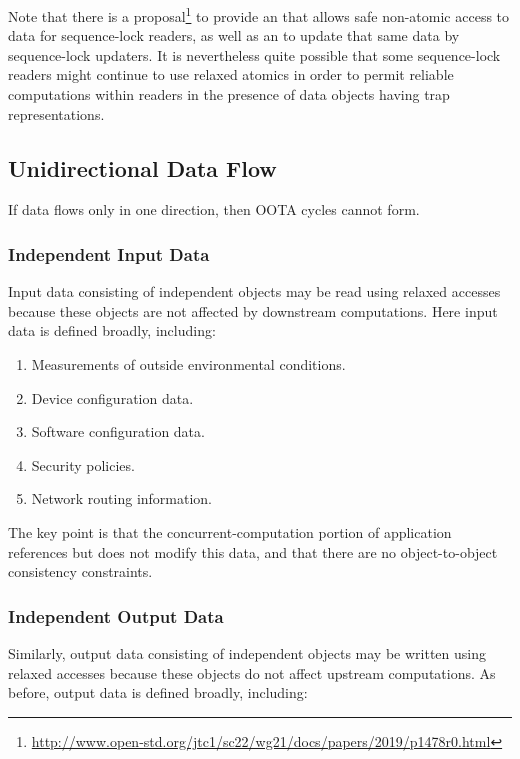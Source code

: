 \documentclass[10]{article}
\begin{document}
Note that there is a proposal\footnote{
	\url{http://www.open-std.org/jtc1/sc22/wg21/docs/papers/2019/p1478r0.html}}
to provide an  that allows safe
non-atomic access to data for sequence-lock readers, as well as an
 to update that same data by
sequence-lock updaters.
It is nevertheless quite possible that some sequence-lock readers
might continue to use relaxed atomics in order to permit reliable
computations within readers in the presence of data objects having
trap representations.

\subsection{Unidirectional Data Flow}
\label{sec:Unidirectional Data Flow}

If data flows only in one direction, then OOTA cycles cannot form.

\subsubsection{Independent Input Data}
\label{sec:Independent Input Data}

Input data consisting of independent objects may be read using relaxed
accesses because these objects are not affected by downstream computations.
Here input data is defined broadly, including:

\begin{enumerate}
\item	Measurements of outside environmental conditions.
\item	Device configuration data.
\item	Software configuration data.
\item	Security policies.
\item	Network routing information.
\end{enumerate}

The key point is that the concurrent-computation portion of application
references but does not modify this data, and that there are no
object-to-object consistency constraints.

\subsubsection{Independent Output Data}
\label{sec:Independent Output Data}

Similarly, output data consisting of independent objects may be written
using relaxed accesses because these objects do not affect upstream
computations.
As before, output data is defined broadly, including:
\end{document}
